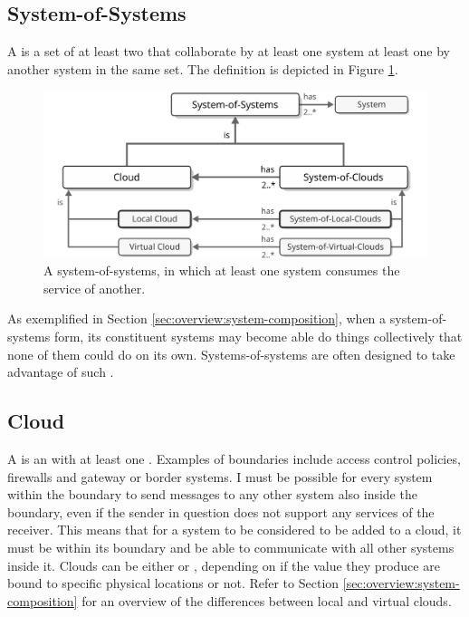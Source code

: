 \newpage

\subsection{System-of-Systems}
\label{sec:concepts:sos}

A  is a set of at least two  that collaborate by at least one system  at least one   by another system in the same set.
The definition is depicted in Figure \ref{fig:system-of-systems}.

\begin{figure}[ht!]
  \centering
  \includegraphics[scale=0.9]{figures/system-of-systems}
  \caption{
    A system-of-systems, in which at least one system consumes the service of another.
  }
  \label{fig:system-of-systems}
\end{figure}

As exemplified in Section \ref{sec:overview:system-composition}, when a system-of-systems form, its constituent systems may become able do things collectively that none of them could do on its own.
Systems-of-systems are often designed to take advantage of such .

\subsection{Cloud}
\label{sec:concepts:cloud}

A  is an   with at least one .
Examples of boundaries include access control policies, firewalls and gateway or border systems.
I must be possible for every system within the boundary to send messages to any other system also inside the boundary, even if the sender in question does not support any services of the receiver.
This means that for a system to be considered to be added to a cloud, it must be within its boundary and be able to communicate with all other systems inside it.
Clouds can be either  or , depending on if the value they produce are bound to specific physical locations or not.
Refer to Section \ref{sec:overview:system-composition} for an overview of the differences between local and virtual clouds.

